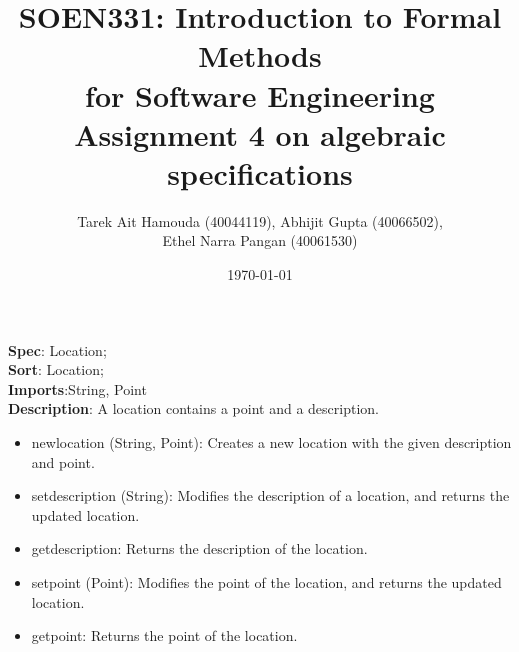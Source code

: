 \documentclass[12pt]{article}
\title{SOEN331: Introduction to Formal Methods\\for Software Engineering\\
Assignment 4 on algebraic specifications}
\author{Tarek Ait Hamouda (40044119), Abhijit Gupta (40066502), \\Ethel Narra Pangan (40061530)}
\date{\today}
\begin{document}
\begin{spacing}{1.5}

\maketitle

\noindent \textbf{Spec}: Location;\\
\noindent \textbf{Sort}: Location;\\
\noindent \textbf{Imports}:String, Point\\
\noindent \textbf{Description}: A location contains a point and a description.
\begin{itemize}
	\item newlocation (String, Point): Creates a new location with the given description and point.
	\item setdescription (String): Modifies the description of a location, and returns the updated location.
	\item getdescription: Returns the description of the location.
	\item setpoint (Point): Modifies the point of the location, and returns the updated location.
	\item getpoint: Returns the point of the location.
\end{itemize}


\end{spacing}
\end{document}
